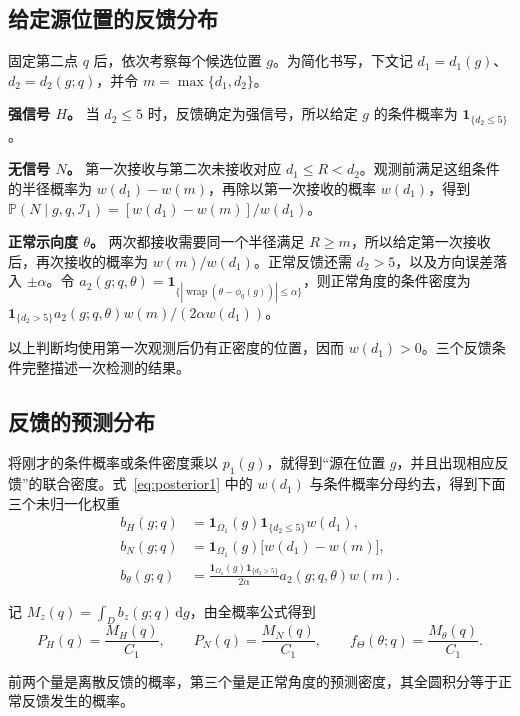 \documentclass[UTF8,a4paper,zihao=-4,fontset=none]{ctexart}
\numberwithin{equation}{section}
\newcommand{\ind}{\mathbf 1}
\newcommand{\dd}{\,\mathrm d}
\newcommand{\Prob}{\mathbb P}
\newcommand{\wrap}{\operatorname{wrap}}
\begin{document}
\subsection{给定源位置的反馈分布}
固定第二点 \(q\) 后，依次考察每个候选位置 \(g\)。为简化书写，下文记 \(d_1=d_1(g)\)、\(d_2=d_2(g;q)\)，并令 \(m=\max\{d_1,d_2\}\)。

\textbf{强信号 \(H\)。} 当 \(d_2\le5\) 时，反馈确定为强信号，所以给定 \(g\) 的条件概率为 \(\ind_{\{d_2\le5\}}\)。

\textbf{无信号 \(N\)。} 第一次接收与第二次未接收对应 \(d_1\le R<d_2\)。观测前满足这组条件的半径概率为 \(w(d_1)-w(m)\)，再除以第一次接收的概率 \(w(d_1)\)，得到 \(\Prob(N\mid g,q,\mathcal I_1)=[w(d_1)-w(m)]/w(d_1)\)。

\textbf{正常示向度 \(\theta\)。} 两次都接收需要同一个半径满足 \(R\ge m\)，所以给定第一次接收后，再次接收的概率为 \(w(m)/w(d_1)\)。正常反馈还需 \(d_2>5\)，以及方向误差落入 \(\pm\alpha\)。令 \(a_2(g;q,\theta)=\ind_{\{|\wrap(\theta-\phi_q(g))|\le\alpha\}}\)，则正常角度的条件密度为 \(\ind_{\{d_2>5\}}a_2(g;q,\theta)w(m)/(2\alpha w(d_1))\)。

以上判断均使用第一次观测后仍有正密度的位置，因而 \(w(d_1)>0\)。三个反馈条件完整描述一次检测的结果。

\subsection{反馈的预测分布}
将刚才的条件概率或条件密度乘以 \(p_1(g)\)，就得到“源在位置 \(g\)，并且出现相应反馈”的联合密度。式~\eqref{eq:posterior1} 中的 \(w(d_1)\) 与条件概率分母约去，得到下面三个未归一化权重
\begin{equation}\label{eq:weights}
\begin{aligned}
b_H(g;q)&=\ind_{\Omega_1}(g)\ind_{\{d_2\le5\}}w(d_1),\\
b_N(g;q)&=\ind_{\Omega_1}(g)\bigl[w(d_1)-w(m)\bigr],\\
b_\theta(g;q)&=\frac{\ind_{\Omega_1}(g)\ind_{\{d_2>5\}}}{2\alpha}
 a_2(g;q,\theta)w(m).
\end{aligned}
\end{equation}

记 \(M_z(q)=\int_D b_z(g;q)\dd g\)，由全概率公式得到
\begin{equation}\label{eq:feedbackprob}
P_H(q)=\frac{M_H(q)}{C_1},\qquad
P_N(q)=\frac{M_N(q)}{C_1},\qquad
f_\Theta(\theta;q)=\frac{M_\theta(q)}{C_1}.
\end{equation}

前两个量是离散反馈的概率，第三个量是正常角度的预测密度，其全圆积分等于正常反馈发生的概率。
\end{document}
